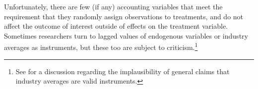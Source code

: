 \documentclass[12pt,reqno,titlepage]{amsart}
\theoremstyle{definition}
\begin{document}
\begin{doublespace}
Unfortunately, there are few (if any) accounting variables that meet the requirement that they randomly assign observations to treatments, and do not affect the outcome of interest outside of effects on the treatment variable.
Sometimes researchers turn to lagged values of endogenous variables or industry averages as instruments, but these too are subject to criticism.\footnote{
See \citet{Reiss:2007ej} for a discussion regarding the implausibility of general claims that industry averages are valid instruments.}  



\end{doublespace}
\end{document}
